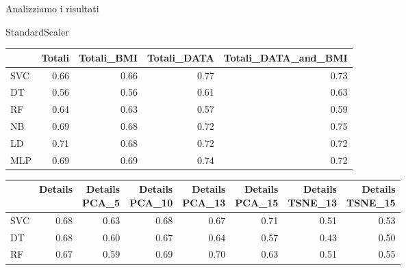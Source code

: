 \documentclass{beamer}
\begin{document}
\begin{frame}{Analizziamo i risultati}
\begin{block}{StandardScaler}
	\begin{center}
		\begin{adjustbox}{max width=\textwidth}
			\begin{tabular}{lrrrr}
				\toprule
				{} &    Totali &  Totali\_BMI &  Totali\_DATA &  Totali\_DATA\_and\_BMI \\
				\midrule
				SVC &  0.66 &         0.66 &          0.77 &                  0.73 \\
				DT  &  0.56 &         0.56 &          0.61 &                  0.63 \\
				RF  &  0.64 &         0.63 &          0.57 &                  0.59 \\
				NB  &  0.69 &         0.68 &          0.72 &                  0.75 \\
				LD  &  0.71 &         0.68 &          0.72 &                  0.72 \\
				MLP &  0.69 &         0.69 &          0.74 &                  0.72 \\
				\bottomrule
			\end{tabular}
		\end{adjustbox}
	\end{center}
	\begin{center}
		\begin{adjustbox}{max width=\textwidth}
			\begin{tabular}{lrrrrrrr}
				\toprule
				{} &   Details &  \thead{Details\\PCA\_5} & \thead{Details\\ PCA\_10} &  \thead{Details\\ PCA\_13} &  \thead{Details\\PCA\_15} &  \thead{Details\\TSNE\_13} &  \thead{Details\\TSNE\_15} \\
				\midrule
				SVC &  0.68 &                  0.63 &                   0.68 &                   0.67 &                   0.71 &                    0.51 &                    0.53 \\
				DT  &  0.68 &                  0.60 &                   0.67 &                   0.64 &                   0.57 &                    0.43 &                    0.50 \\
				RF  &  0.67 &                  0.59 &                   0.69 &                   0.70 &                   0.63 &                    0.51 &                    0.55 \\

\end{tabular}
\end{adjustbox}
\end{center}
\end{block}
\end{frame}
\end{document}
